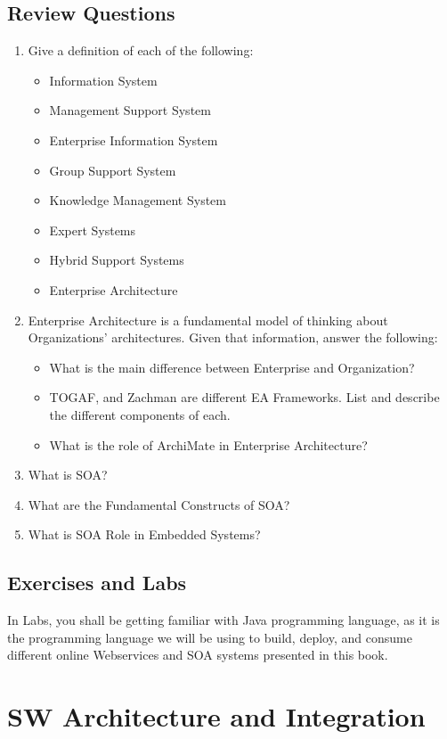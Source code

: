 \documentclass[12pt,a4paper,final,twoside,onecolumn,titlepage]{book}
\begin{document}
\section{Review Questions}
\begin{enumerate}
\item Give a definition of each of the following:
\begin{itemize}
\item Information System
\item Management Support System
\item Enterprise Information System
\item Group Support System
\item Knowledge Management System 
\item Expert Systems
\item Hybrid Support Systems
\item Enterprise Architecture
\end{itemize}
\item Enterprise Architecture is a fundamental model of thinking about Organizations' architectures. Given that information, answer the following:
\begin{itemize}
\item What is the main difference between Enterprise and Organization?
\item TOGAF, and Zachman are different \gls{EA} Frameworks. List and describe the different components of each.
\item What is the role of ArchiMate in Enterprise Architecture?
\end{itemize}
\item What is SOA?
\item What are the Fundamental Constructs of SOA?
\item What is SOA Role in Embedded Systems?
\end{enumerate}

\section{Exercises and Labs}
In Labs, you shall be getting familiar with Java programming language, as it is the programming language we will be using to build, deploy, and consume different online Webservices and \gls{SOA} systems presented in this book.

\chapter{SW Architecture and Integration}
\label{SWArchitectureandIntegration}
\end{document}
